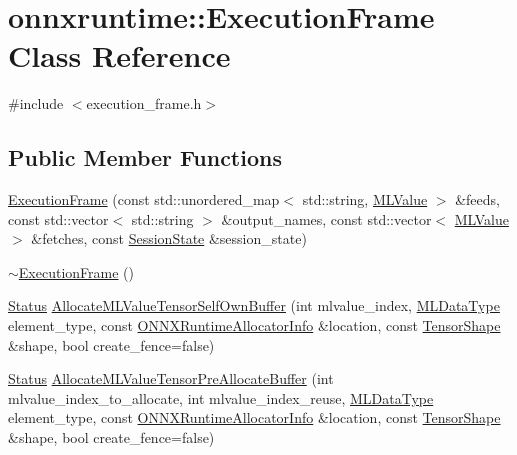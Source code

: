 \hypertarget{classonnxruntime_1_1ExecutionFrame}{}\section{onnxruntime\+:\+:Execution\+Frame Class Reference}
\label{classonnxruntime_1_1ExecutionFrame}


{\ttfamily \#include $<$execution\+\_\+frame.\+h$>$}

\subsection*{Public Member Functions}
\begin{DoxyCompactItemize}
\item 
\mbox{\hyperlink{classonnxruntime_1_1ExecutionFrame_a178fde48605c7e07f08f39d8aa8148f8}{Execution\+Frame}} (const std\+::unordered\+\_\+map$<$ std\+::string, \mbox{\hyperlink{classonnxruntime_1_1MLValue}{M\+L\+Value}} $>$ \&feeds, const std\+::vector$<$ std\+::string $>$ \&output\+\_\+names, const std\+::vector$<$ \mbox{\hyperlink{classonnxruntime_1_1MLValue}{M\+L\+Value}} $>$ \&fetches, const \mbox{\hyperlink{classonnxruntime_1_1SessionState}{Session\+State}} \&session\+\_\+state)
\item 
\mbox{\hyperlink{classonnxruntime_1_1ExecutionFrame_ae3466a98440b293795cb6d3bbab14692}{$\sim$\+Execution\+Frame}} ()
\item 
\mbox{\hyperlink{classonnxruntime_1_1common_1_1Status}{Status}} \mbox{\hyperlink{classonnxruntime_1_1ExecutionFrame_a97f2f3f7e7eade038b84beff760a1c31}{Allocate\+M\+L\+Value\+Tensor\+Self\+Own\+Buffer}} (int mlvalue\+\_\+index, \mbox{\hyperlink{namespaceonnxruntime_ad77d0a6e838ec7da5dc35fed5ee66b49}{M\+L\+Data\+Type}} element\+\_\+type, const \mbox{\hyperlink{structONNXRuntimeAllocatorInfo}{O\+N\+N\+X\+Runtime\+Allocator\+Info}} \&location, const \mbox{\hyperlink{classonnxruntime_1_1TensorShape}{Tensor\+Shape}} \&shape, bool create\+\_\+fence=false)
\item 
\mbox{\hyperlink{classonnxruntime_1_1common_1_1Status}{Status}} \mbox{\hyperlink{classonnxruntime_1_1ExecutionFrame_ab9258655e4e9c24ccf6db9ba320a668b}{Allocate\+M\+L\+Value\+Tensor\+Pre\+Allocate\+Buffer}} (int mlvalue\+\_\+index\+\_\+to\+\_\+allocate, int mlvalue\+\_\+index\+\_\+reuse, \mbox{\hyperlink{namespaceonnxruntime_ad77d0a6e838ec7da5dc35fed5ee66b49}{M\+L\+Data\+Type}} element\+\_\+type, const \mbox{\hyperlink{structONNXRuntimeAllocatorInfo}{O\+N\+N\+X\+Runtime\+Allocator\+Info}} \&location, const \mbox{\hyperlink{classonnxruntime_1_1TensorShape}{Tensor\+Shape}} \&shape, bool create\+\_\+fence=false)

\end{DoxyCompactItemize}
